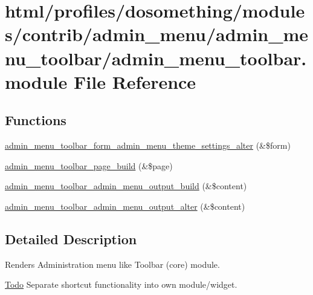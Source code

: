 \hypertarget{admin__menu__toolbar_8module}{
\section{html/profiles/dosomething/modules/contrib/admin\_\-menu/admin\_\-menu\_\-toolbar/admin\_\-menu\_\-toolbar.module File Reference}
\label{admin__menu__toolbar_8module}
}
\subsection*{Functions}
\begin{DoxyCompactItemize}
\item 
\hyperlink{admin__menu__toolbar_8module_aae5cecf58b2e516927281143d392927e}{admin\_\-menu\_\-toolbar\_\-form\_\-admin\_\-menu\_\-theme\_\-settings\_\-alter} (\&\$form)
\item 
\hyperlink{admin__menu__toolbar_8module_a398c1718f88449b886028877688a4864}{admin\_\-menu\_\-toolbar\_\-page\_\-build} (\&\$page)
\item 
\hyperlink{admin__menu__toolbar_8module_adf1db6f09a7fe73cf29064b5f9937c2a}{admin\_\-menu\_\-toolbar\_\-admin\_\-menu\_\-output\_\-build} (\&\$content)
\item 
\hyperlink{admin__menu__toolbar_8module_abf3ffd52da68fc9581db3804043ea693}{admin\_\-menu\_\-toolbar\_\-admin\_\-menu\_\-output\_\-alter} (\&\$content)
\end{DoxyCompactItemize}


\subsection{Detailed Description}
Renders Administration menu like Toolbar (core) module.

\begin{Desc}
\item[\hyperlink{todo__todo000031}{Todo}]Separate shortcut functionality into own module/widget. \end{Desc}


